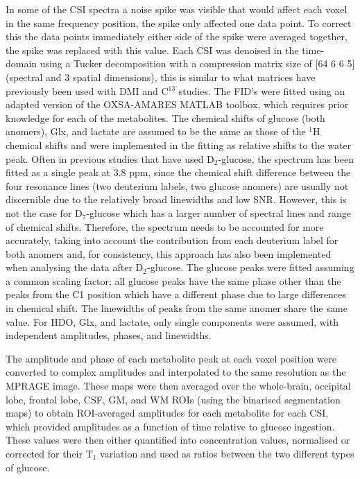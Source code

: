 \documentclass[class=article, crop=false]{standalone}
\begin{document}
In some of the CSI spectra a noise spike was visible that would affect each voxel in the same frequency position, the spike only affected one data point. To correct this the data points immediately either side of the spike were averaged together, the spike was replaced with this value. Each CSI was denoised in the time-domain using a Tucker decomposition\cite{Bader2007EfficientTensors} with a compression matrix size of [64 6 6 5] (spectral and 3 spatial dimensions), this is similar to what  matrices have previously been used with DMI\cite{vonMorze2021ComparisonT, Kreis2020MeasuringMRI} and C$^{13}$ studies\cite{Brender2019DynamicHyperpolarization}. The FID’s were fitted using an adapted version of the OXSA-AMARES MATLAB toolbox\cite{Vanhamme1997ImprovedKnowledge, Purvis2017OXSA:MATLAB}, which requires prior knowledge for each of the metabolites. The chemical shifts of glucose (both anomers), Glx, and lactate are assumed to be the same as those of the $^1$H chemical shifts\cite{Govindaraju2000ProtonMetabolites} and were implemented in the fitting as relative shifts to the water peak\cite{Meerwaldt2023InImaging}. Often in previous studies that have used D$_2$-glucose, the spectrum has been fitted as a single peak at 3.8 ppm, since the chemical shift difference between the four resonance lines (two deuterium labels, two glucose anomers) are usually not discernible due to the relatively broad linewidths and low SNR. However, this is not the case for D$_7$-glucose\cite{Govindaraju2000ProtonMetabolites} which has a larger number of spectral lines and range of chemical shifts. Therefore, the spectrum needs to be accounted for more accurately, taking into account the contribution from each deuterium label for both anomers and, for consistency, this approach has also been implemented when analysing the data after D$_2$-glucose. The glucose peaks were fitted assuming a common scaling factor; all glucose peaks have the same phase other than the peaks from the C1 position which have a different phase due to large differences in chemical shift. The linewidths of peaks from the same anomer share the same value. For HDO, Glx, and lactate, only single components were assumed, with independent amplitudes, phases, and linewidths.

The amplitude and phase of each metabolite peak at each voxel position were converted to complex amplitudes and interpolated to the same resolution as the MPRAGE image. These maps were then averaged over the whole-brain, occipital lobe, frontal lobe, CSF, GM, and WM ROIs (using the binarised segmentation maps) to obtain ROI-averaged amplitudes for each metabolite for each CSI, which provided amplitudes as a function of time relative to glucose ingestion. These values were then either quantified into concentration values, normalised or corrected for their T$_1$ variation and used as ratios between the two different types of glucose.
\end{document}
